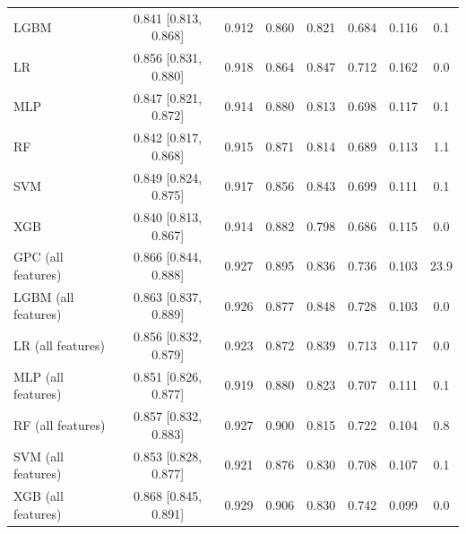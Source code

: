 \begin{tabular}{lccccccc}
LGBM & 0.841 [0.813, 0.868] & 0.912 & 0.860 & 0.821 & 0.684 & 0.116 & 0.1 \\
LR & 0.856 [0.831, 0.880] & 0.918 & 0.864 & 0.847 & 0.712 & 0.162 & 0.0 \\
MLP & 0.847 [0.821, 0.872] & 0.914 & 0.880 & 0.813 & 0.698 & 0.117 & 0.1 \\
RF & 0.842 [0.817, 0.868] & 0.915 & 0.871 & 0.814 & 0.689 & 0.113 & 1.1 \\
SVM & 0.849 [0.824, 0.875] & 0.917 & 0.856 & 0.843 & 0.699 & 0.111 & 0.1 \\
XGB & 0.840 [0.813, 0.867] & 0.914 & 0.882 & 0.798 & 0.686 & 0.115 & 0.0 \\
\midrule
GPC (all features) & 0.866 [0.844, 0.888] & 0.927 & 0.895 & 0.836 & 0.736 & 0.103 & 23.9 \\
LGBM (all features) & 0.863 [0.837, 0.889] & 0.926 & 0.877 & 0.848 & 0.728 & 0.103 & 0.0 \\
LR (all features) & 0.856 [0.832, 0.879] & 0.923 & 0.872 & 0.839 & 0.713 & 0.117 & 0.0 \\
MLP (all features) & 0.851 [0.826, 0.877] & 0.919 & 0.880 & 0.823 & 0.707 & 0.111 & 0.1 \\
RF (all features) & 0.857 [0.832, 0.883] & 0.927 & 0.900 & 0.815 & 0.722 & 0.104 & 0.8 \\
SVM (all features) & 0.853 [0.828, 0.877] & 0.921 & 0.876 & 0.830 & 0.708 & 0.107 & 0.1 \\
XGB (all features) & 0.868 [0.845, 0.891] & 0.929 & 0.906 & 0.830 & 0.742 & 0.099 & 0.0 \\
\bottomrule
\end{tabular}